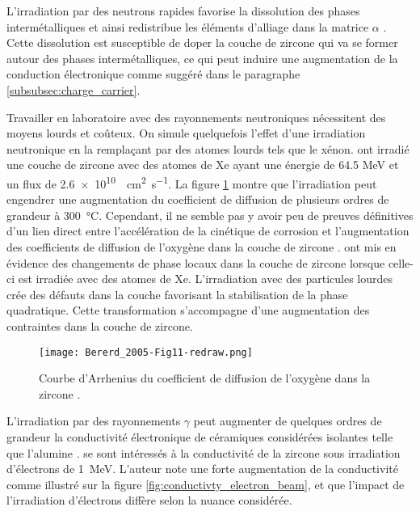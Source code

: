 \begin{refsection}
    L'irradiation par des neutrons rapides favorise la dissolution des phases intermétalliques et ainsi redistribue les
    éléments d'alliage dans la matrice $\alpha$ \citep{Vizcaino2008, Garzarolli2002}. 
    Cette dissolution est susceptible de doper la couche de zircone qui va se former autour des phases intermétalliques,
    ce qui peut induire une augmentation de la conduction
    électronique comme suggéré dans le paragraphe \ref{subsubsec:charge_carrier}.
    
    Travailler en laboratoire avec des rayonnements
    neutroniques nécessitent des moyens lourds et coûteux. On simule quelquefois l'effet d'une
    irradiation neutronique en la remplaçant par des atomes lourds tels que le xénon.
    \citet{Bererd2005} ont irradié une couche de zircone avec des atomes de Xe  
    ayant une énergie de 64.5 MeV et un flux de \SI{2.6e10}{\per\square\centi\meter\per\second}. La figure
    \ref{fig:Bererd_diffusion_increase} montre que l'irradiation peut engendrer une augmentation du coefficient de
    diffusion de plusieurs ordres de grandeur à \SI{300}{\degreeCelsius}. Cependant, il ne semble pas y avoir peu de preuves
    définitives d'un lien direct entre l'accélération de la cinétique de corrosion et l'augmentation des coefficients de
    diffusion de l'oxygène dans la couche de zircone \citep{IAEA1993, IAEA1998}.
    \citet{Simeone2000, Simeone2002} ont mis en évidence des
    changements de phase locaux dans la couche de zircone lorsque celle-ci est irradiée avec des atomes de Xe.
    L'irradiation avec des particules lourdes crée des défauts dans la couche favorisant la stabilisation de la phase
    quadratique. Cette transformation s'accompagne d'une augmentation des contraintes dans la couche
    de zircone.

    \begin{figure}[H]
        \centering
        \texttt{[image: Bererd\_2005-Fig11-redraw.png]}
        \caption[Courbe d'Arrhenius du coefficient de diffusion de l'oxygène dans la zircone.]{Courbe d'Arrhenius du
        coefficient de diffusion de l'oxygène dans la zircone \citep{Bererd2005}.}
        \label{fig:Bererd_diffusion_increase}
    \end{figure}


    L'irradiation par des rayonnements $\gamma$ peut augmenter de quelques ordres de grandeur la conductivité
    électronique de
    céramiques considérées isolantes telle que l'alumine \citep{Shikama1994}. \citet{Howlader1999} se sont intéressés à la
    conductivité de la zircone sous irradiation d'électrons de 1~MeV. L'auteur note une forte augmentation de
    la conductivité comme illustré sur la figure \ref{fig:conductivty_electron_beam}, et que l'impact de
    l'irradiation d'électrons diffère selon la nuance considérée. 



\end{refsection}
